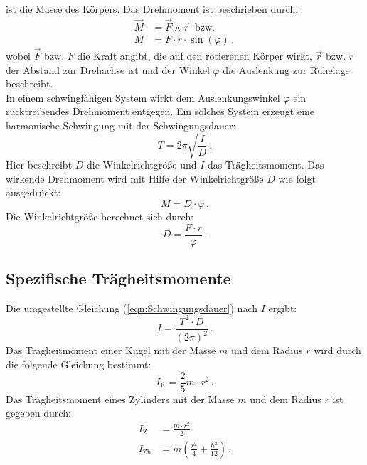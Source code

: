 ist die Masse des Körpers. 
Das Drehmoment ist beschrieben durch:
\begin{align}
    \vec{M} &= \vec{F} \times \vec {r}\, \text{  bzw.} \label{eqn:DrehmomentVektor} \\
    M &= F \cdot r \cdot \sin \left(\varphi \right) \,, \label{eqn:DrehmomentSkalar}
\end{align}
%
wobei $\vec{F}$ bzw. $F$ die Kraft angibt, die auf den rotierenen Körper wirkt, $\vec{r}$ 
bzw. $r$ der Abstand zur Drehachse ist und der Winkel $\varphi$ die Auslenkung zur
Ruhelage beschreibt. \\
In einem schwingfähigen System wirkt dem Auslenkungswinkel $\varphi$ ein rücktreibendes Drehmoment entgegen.
Ein solches System erzeugt eine harmonische Schwingung mit der Schwingungsdauer: 
\begin{equation}
    T = 2 \pi \sqrt{\frac{I}{D}}\,.
    \label{eqn:Schwingungsdauer}
 \end{equation}
Hier beschreibt $D$ die Winkelrichtgröße und $I$ das Trägheitsmoment.  
Das wirkende Drehmoment wird mit Hilfe der Winkelrichtgröße $D$ wie folgt ausgedrückt:
\begin{equation}
   M = D \cdot \varphi\,.
   \label{eqn:DrehmomentMitWinkelrichtgröße}
\end{equation}
%
Die Winkelrichtgröße berechnet sich durch: 
\begin{equation}
   D = \frac{F \cdot r}{\varphi}\,.
    \label{eqn:Winkelrichtgröße}
\end{equation}
%
\subsection{Spezifische Trägheitsmomente}
\label{sec:Trägheitsmomente}
Die umgestellte Gleichung (\ref{eqn:Schwingungsdauer}) nach $I$ ergibt:
\begin{equation}
    I = \frac{T^{2} \cdot D}{\left(2 \pi\right)^{2}}\,.
    \label{eqn:TragheitmomentAusSchwingungsdauer}
\end{equation}
%
Das Trägheitmoment einer Kugel mit der Masse $m$ und dem Radius $r$ wird durch die folgende Gleichung
bestimmt: 
\begin{equation}
    I_{\text{K}} = \frac{2}{5}m \cdot r^{2}\,.
    \label{eqn:TragheitKugel}
\end{equation}
Das Trägheitsmoment eines Zylinders mit der Masse $m$ und dem Radius $r$ ist gegeben 
durch:
\begin{align}
    I_{\text{Z}} &= \frac{m \cdot r^2}{2} \label{eqn:TragheitZylinder} \\
    I_{\text{Zh}} &= m \left(\frac{r^{2}}{4} + \frac{h^{2}}{12} \right) \label{eqn:TrägheitZylinderQuer}\,.
\end{align}
%
%
